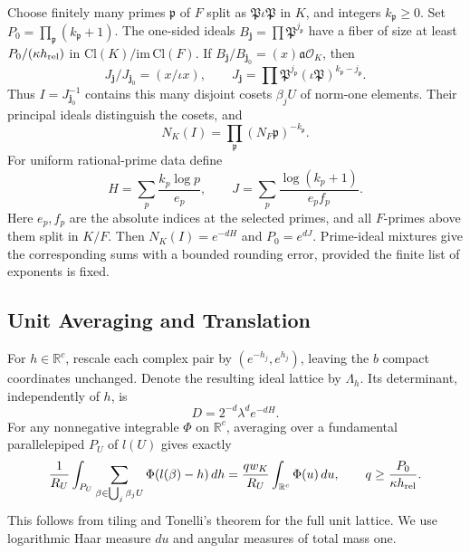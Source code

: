 Choose finitely many primes $\mathfrak p$ of $F$ split as
$\mathfrak P\iota\mathfrak P$ in $K$, and integers $k_{\mathfrak p}\ge0$.
Set $P_0=\prod_{\mathfrak p}(k_{\mathfrak p}+1)$. The one-sided ideals
$B_{\boldsymbol j}=\prod\mathfrak P^{j_{\mathfrak p}}$ have a fiber of
size at least $P_0/(\kappa h_{\rm rel})$ in
$\mathrm{Cl}(K)/\mathrm{im}\,\mathrm{Cl}(F)$. If
$B_{\boldsymbol j}/B_{\boldsymbol j_0}=(x)\mathfrak a\mathcal O_K$, then
\[
 J_{\boldsymbol j}/J_{\boldsymbol j_0}=(x/\iota x),\qquad
 J_{\boldsymbol j}=\prod\mathfrak P^{j_{\mathfrak p}}
                (\iota\mathfrak P)^{k_{\mathfrak p}-j_{\mathfrak p}}.
\]
Thus $I=J_{\boldsymbol j_0}^{-1}$ contains this many disjoint cosets
$\beta_jU$ of norm-one elements. Their principal ideals distinguish the
cosets, and
\[
 N_K(I)=\prod_{\mathfrak p}(N_F\mathfrak p)^{-k_{\mathfrak p}}.
\]
For uniform rational-prime data define
\begin{equation}\label{geo:HJ}
 H=\sum_p\frac{k_p\log p}{e_p},\qquad
 J=\sum_p\frac{\log(k_p+1)}{e_pf_p}.
\end{equation}
Here $e_p,f_p$ are the absolute indices at the selected primes, and all
$F$-primes above them split in $K/F$. Then $N_K(I)=e^{-dH}$ and
$P_0=e^{dJ}$. Prime-ideal mixtures give the corresponding sums with a
bounded rounding error, provided the finite list of exponents is fixed.

\subsection{Unit Averaging and Translation}

For $h\in\mathbb R^c$, rescale each complex pair by $(e^{-h_j},e^{h_j})$,
leaving the $b$ compact coordinates unchanged. Denote the resulting ideal
lattice by $\Lambda_h$. Its determinant, independently of $h$, is
\begin{equation}\label{geo:determinant}
 D=2^{-d}\lambda^d e^{-dH}.
\end{equation}
For any nonnegative integrable $\Phi$ on $\mathbb R^c$, averaging over a
fundamental parallelepiped $P_U$ of $l(U)$ gives exactly
\begin{equation}\label{geo:unfold}
 \frac1{R_U}\int_{P_U}
 \sum_{\beta\in\bigcup_j\beta_jU}\Phi(l(\beta)-h)\,dh
 =\frac{q w_K}{R_U}\int_{\mathbb R^c}\Phi(u)\,du,
 \qquad q\ge\frac{P_0}{\kappa h_{\rm rel}}.
\end{equation}
This follows from tiling and Tonelli's theorem for the full unit lattice.
We use logarithmic Haar measure $du$ and angular measures of total mass
one.


